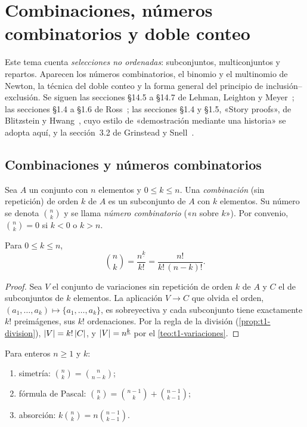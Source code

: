 \chapter{Combinaciones, números combinatorios y doble conteo}
\label{tema:2}

Este tema cuenta \emph{selecciones no ordenadas}: subconjuntos, multiconjuntos y repartos. Aparecen los números combinatorios, el binomio y el multinomio de Newton, la técnica del doble conteo y la forma general del principio de inclusión--exclusión. Se siguen las secciones §14.5 a §14.7 de Lehman, Leighton y Meyer~\cite{mcs}; las secciones §1.4 a §1.6 de Ross~\cite{ross}; las secciones §1.4 y §1.5, «Story proofs», de Blitzstein y Hwang~\cite{bh}, cuyo estilo de «demostración mediante una historia» se adopta aquí, y la sección~3.2 de Grinstead y Snell~\cite{gs}.

\section{Combinaciones y números combinatorios}

\begin{definicion}[Combinaciones]
Sea $A$ un conjunto con $n$ elementos y $0\le k\le n$. Una \emph{combinación} (sin repetición) de orden $k$ de $A$ es un subconjunto de $A$ con $k$ elementos. Su número se denota $\binom{n}{k}$ y se llama \emph{número combinatorio} («$n$ sobre $k$»). Por convenio, $\binom{n}{k}=0$ si $k<0$ o $k>n$.
\end{definicion}

\begin{teorema}\label{teo:t2-binom}
Para $0\le k\le n$,
\[
\binom{n}{k}=\frac{n^{\underline{k}}}{k!}=\frac{n!}{k!\,(n-k)!}.
\]
\end{teorema}

\begin{proof}
Sea $V$ el conjunto de variaciones sin repetición de orden $k$ de $A$ y $C$ el de subconjuntos de $k$ elementos. La aplicación $V\to C$ que olvida el orden, $(a_1,\dots,a_k)\mapsto\{a_1,\dots,a_k\}$, es sobreyectiva y cada subconjunto tiene exactamente $k!$ preimágenes, sus $k!$ ordenaciones. Por la regla de la división (\cref{prop:t1-division}), $\lvert V\rvert=k!\,\lvert C\rvert$, y $\lvert V\rvert=n^{\underline{k}}$ por el \cref{teo:t1-variaciones}.
\end{proof}

\begin{proposicion}\label{prop:t2-props}
Para enteros $n\ge1$ y $k$:
\begin{enumerate}
  \item simetría: $\binom{n}{k}=\binom{n}{n-k}$;
  \item fórmula de Pascal: $\binom{n}{k}=\binom{n-1}{k}+\binom{n-1}{k-1}$;
  \item absorción: $k\binom{n}{k}=n\binom{n-1}{k-1}$.
\end{enumerate}
\end{proposicion}

